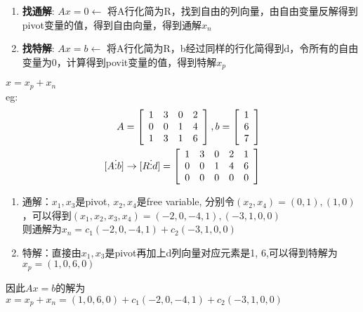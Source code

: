 \documentclass{book}
\begin{document}
\begin{enumerate}
  \item \textbf{找通解}: $Ax=0\leftarrow$ 将A行化简为R，找到自由的列向量，由自由变量反解得到pivot变量的值，得到自由向量，得到通解$x_n$
  \item \textbf{找特解}: $Ax=b\leftarrow$ 将A行化简为R，b经过同样的行化简得到d，令所有的自由变量为0，计算得到povit变量的值，得到特解$x_p$
\end{enumerate}
$x=x_p+x_n$\\
eg: \\ 
\begin{equation*}
  \begin{aligned}
    A&=\left[
      \begin{array}{c c c c }
        1 & 3 & 0 & 2\\ 
        0 & 0 & 1 & 4\\ 
        1 & 3 & 1 & 6
      \end{array}
    \right], 
  b=\left[
    \begin{array}{c }
     1\\6\\7
    \end{array}
  \right]\\ 
[A\vdots b]&\rightarrow[R\vdots d]=\left[
  \begin{array}{c c c c c }
    1 & 3 & 0 & 2 &1\\ 
    0 & 0 & 1 & 4 &6\\ 
    0 & 0 & 0 & 0 &0
  \end{array}
\right]
  \end{aligned} 
\end{equation*}
\begin{enumerate}
  \item 通解：$x_1, x_3$是pivot, $x_2, x_4$是free variable, 分别令$(x_2, x_4)=(0, 1), (1, 0)$，可以得到$(x_1, x_2, x_3, x_4)=(-2, 0, -4, 1), (-3, 1, 0, 0)$\\ 
    则通解为$x_n=c_1(-2, 0, -4, 1)+c_2(-3, 1,0, 0)$
  \item 特解：直接由$x_1, x_3$是pivot再加上d列向量对应元素是1, 6,可以得到特解为$x_p=(1, 0, 6, 0)$
\end{enumerate}
因此$Ax=b$的解为$x=x_p+x_n=(1, 0, 6, 0)+c_1(-2, 0, -4, 1)+c_2(-3, 1,0, 0)$



\end{document}
